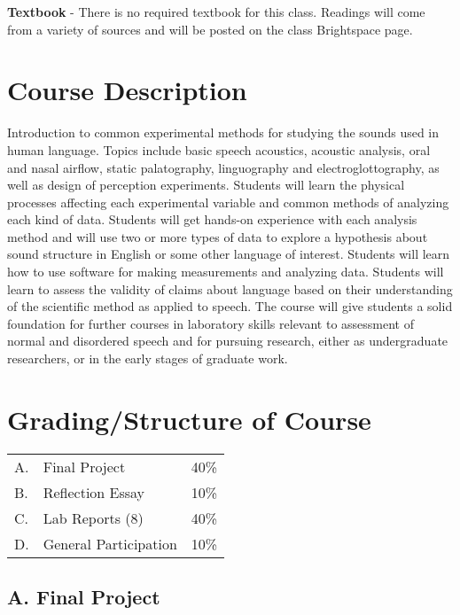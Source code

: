 \documentclass[11pt]{article}
\begin{document}
\textbf{Textbook} - There is no required textbook for this class. Readings will come from a variety of sources and will be posted on the class Brightspace page.



\section*{Course Description}

Introduction to common experimental methods for studying the sounds used in human language. Topics include basic speech acoustics, acoustic analysis, oral and nasal airflow, static palatography, linguography and electroglottography, as well as design of perception experiments. Students will learn the physical processes affecting each experimental variable and common methods of analyzing each kind of data. Students will get hands-on experience with each analysis method and will use two or more types of data to explore a hypothesis about sound structure in English or some other language of interest. Students will learn how to use software for making measurements and analyzing data. Students will learn to assess the validity of claims about language based on their understanding of the scientific method as applied to speech. The course will give students a solid foundation for further courses in laboratory skills relevant to assessment of normal and disordered speech and for pursuing research, either as undergraduate researchers, or in the early stages of graduate work.

\section*{Grading/Structure of Course}

\begin{center}
\begin{tabular}{l l l}
	\hline
	A. & Final Project & 40\% \\
	B. & Reflection Essay & 10\% \\
	C. & Lab Reports (8) & 40\% \\
	D. & General Participation & 10\%  \\
	\hline
\end{tabular}
\end{center}

\subsection*{A. Final Project}
\end{document}
